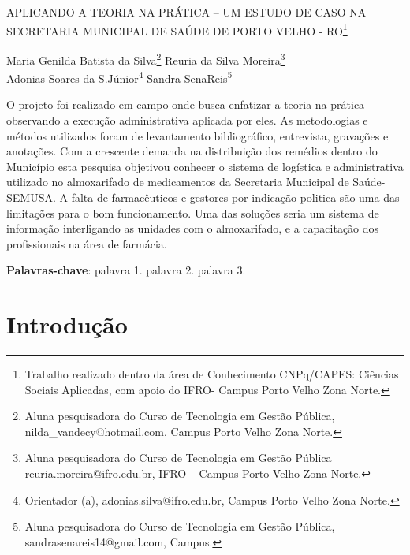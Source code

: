 \documentclass[article,12pt,onesidea,4paper,english,brazil]{abntex2}
\begin{document}
	
	
	\frenchspacing 
	
	\begin{center}
		\LARGE APLICANDO A TEORIA NA PRÁTICA – UM ESTUDO DE CASO NA SECRETARIA MUNICIPAL DE SAÚDE DE PORTO VELHO - RO\footnote{Trabalho realizado dentro da área de Conhecimento CNPq/CAPES: Ciências Sociais Aplicadas, com apoio do IFRO- Campus Porto Velho Zona Norte.}
	
	\normalsize
	Maria Genilda Batista da Silva\footnote{Aluna pesquisadora do Curso de Tecnologia em Gestão Pública, nilda\_vandecy@hotmail.com, Campus Porto Velho Zona Norte.} 
	Reuria da Silva Moreira\footnote{Aluna pesquisadora do Curso de Tecnologia em Gestão Pública reuria.moreira@ifro.edu.br, IFRO – Campus Porto Velho Zona Norte.} \\
	Adonias Soares da S.Júnior\footnote{Orientador (a), adonias.silva@ifro.edu.br, Campus Porto Velho Zona Norte.} 
	Sandra SenaReis\footnote{Aluna pesquisadora do Curso de Tecnologia em Gestão Pública, sandrasenareis14@gmail.com, Campus.} 
	\end{center}
	
\begin{resumoumacoluna}
	O projeto foi realizado em campo onde busca enfatizar a teoria na prática observando a execução administrativa aplicada por eles. As metodologias e  métodos utilizados foram de levantamento bibliográfico, entrevista, gravações e anotações. Com a crescente demanda na distribuição dos remédios dentro do Município esta pesquisa objetivou conhecer o sistema de logística e administrativa utilizado no almoxarifado de medicamentos da Secretaria Municipal de Saúde- SEMUSA. A falta de farmacêuticos e gestores por indicação politica são uma das limitações para o bom funcionamento. Uma das soluções seria um sistema de informação interligando as unidades com o almoxarifado, e a capacitação dos profissionais na área de farmácia.
	
	\vspace{\onelineskip}
	
	\noindent
	\textbf{Palavras-chave}: palavra 1. palavra 2. palavra 3.
\end{resumoumacoluna}

\section*{Introdução}
\end{document}
